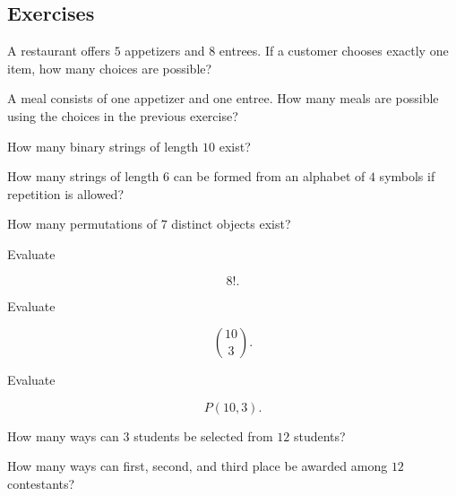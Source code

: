 \subsection{Exercises}
\label{subsec:basic-counting-exercises}

\begin{exercise}[1]
A restaurant offers \(5\) appetizers and \(8\) entrees. If a customer
chooses exactly one item, how many choices are possible?
\end{exercise}

\begin{exercise}[1]
A meal consists of one appetizer and one entree. How many meals are
possible using the choices in the previous exercise?
\end{exercise}

\begin{exercise}[1]
How many binary strings of length \(10\) exist?
\end{exercise}

\begin{exercise}[1]
How many strings of length \(6\) can be formed from an alphabet of
\(4\) symbols if repetition is allowed?
\end{exercise}

\begin{exercise}[1]
How many permutations of \(7\) distinct objects exist?
\end{exercise}

\begin{exercise}[1]
Evaluate

\[
8!.
\]
\end{exercise}

\begin{exercise}[1]
Evaluate

\[
\binom{10}{3}.
\]
\end{exercise}

\begin{exercise}[1]
Evaluate

\[
P(10,3).
\]
\end{exercise}

\begin{exercise}[1]
How many ways can \(3\) students be selected from \(12\) students?
\end{exercise}

\begin{exercise}[1]
How many ways can first, second, and third place be awarded among
\(12\) contestants?
\end{exercise}

